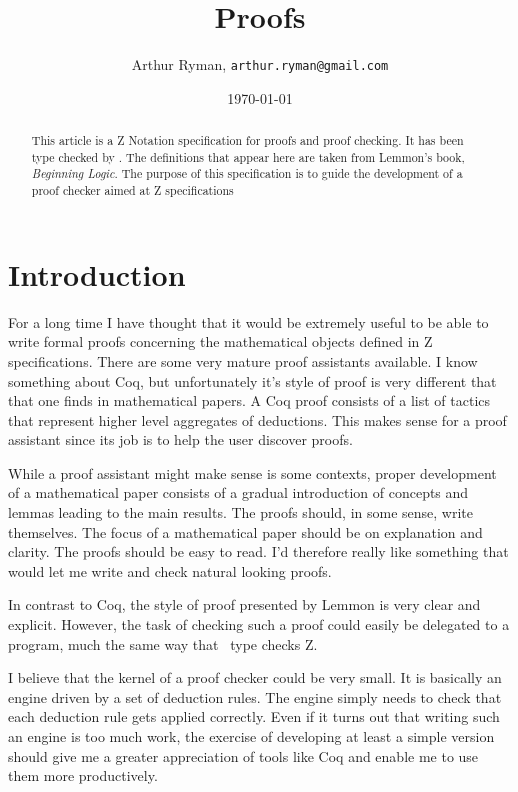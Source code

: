 \documentclass[11pt, oneside]{article}
\title{Proofs}
\author{Arthur Ryman, {\tt arthur.ryman@gmail.com}}
\date{\today}
\begin{document}
\maketitle

\begin{abstract}
This article is a Z Notation specification for proofs and proof checking.
It has been type checked by \fuzz.
The definitions that appear here are taken from Lemmon's book, {\it Beginning Logic}.
The purpose of this specification is to guide the development of a proof checker
aimed at Z specifications
\end{abstract}

\section{Introduction}

For a long time I have thought that it would be extremely useful to be able to write formal proofs
concerning the mathematical objects defined in Z specifications.
There are some very mature proof assistants available.
I know something about Coq, but unfortunately it's style of proof is very different that that one finds in mathematical
papers.
A Coq proof consists of a list of tactics that represent higher level aggregates of deductions.
This makes sense for a proof assistant since its job is to help the user discover proofs.

While a proof assistant might make sense is some contexts, proper development of a mathematical paper
consists of a gradual introduction of concepts and lemmas leading to the main results.
The proofs should, in some sense, write themselves.
The focus of a mathematical paper should be on explanation and clarity.
The proofs should be easy to read.
I'd therefore really like something that would let me write and check natural looking proofs.

In contrast to Coq, the style of proof presented by Lemmon is very clear and explicit.
However, the task of checking such a proof could easily be delegated to a program,
much the same way that \fuzz\ type checks Z.

I believe that the kernel of a proof checker could be very small.
It is basically an engine driven by a set of deduction rules.
The engine simply needs to check that each deduction rule gets applied correctly.
Even if it turns out that writing such an engine is too much work, the exercise of developing
at least a simple version should give me a greater appreciation of tools like Coq and enable me to
use them more productively.
\end{document}
